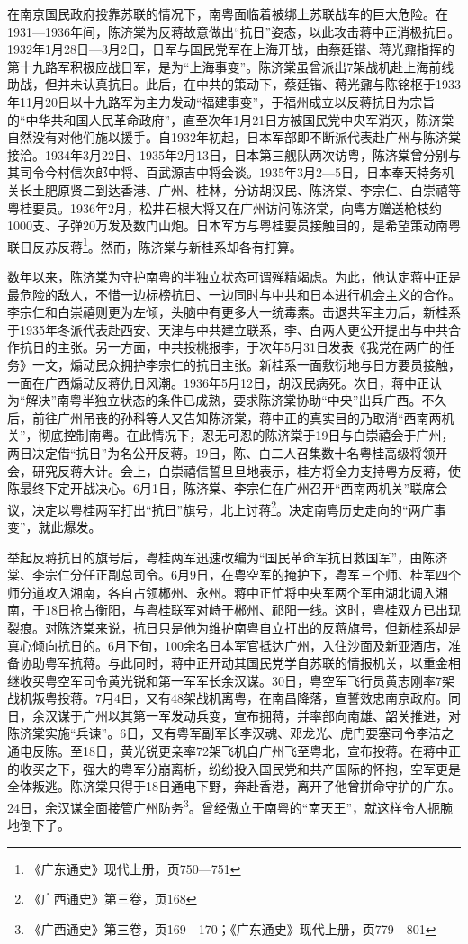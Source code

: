 在南京国民政府投靠苏联的情况下，南粤面临着被绑上苏联战车的巨大危险。在1931—1936年间，陈济棠为反蒋故意做出“抗日”姿态，以此攻击蒋中正消极抗日。1932年1月28日—3月2日，日军与国民党军在上海开战，由蔡廷锴、蒋光鼐指挥的第十九路军积极应战日军，是为“上海事变”。陈济棠虽曾派出7架战机赴上海前线助战，但并未认真抗日。此后，在中共的策动下，蔡廷锴、蒋光鼐与陈铭枢于1933年11月20日以十九路军为主力发动“福建事变”，于福州成立以反蒋抗日为宗旨的“中华共和国人民革命政府”，直至次年1月21日方被国民党中央军消灭，陈济棠自然没有对他们施以援手。自1932年初起，日本军部即不断派代表赴广州与陈济棠接洽。1934年3月22日、1935年2月13日，日本第三舰队两次访粤，陈济棠曾分别与其司令今村信次郎中将、百武源吉中将会谈。1935年3月2—5日，日本奉天特务机关长土肥原贤二到达香港、广州、桂林，分访胡汉民、陈济棠、李宗仁、白崇禧等粤桂要员。1936年2月，松井石根大将又在广州访问陈济棠，向粤方赠送枪枝约1000支、子弹20万发及数门山炮。日本军方与粤桂要员接触目的，是希望策动南粤联日反苏反蒋\footnote{《广东通史》现代上册，页750—751}。然而，陈济棠与新桂系却各有打算。

数年以来，陈济棠为守护南粤的半独立状态可谓殚精竭虑。为此，他认定蒋中正是最危险的敌人，不惜一边标榜抗日、一边同时与中共和日本进行机会主义的合作。李宗仁和白崇禧则更为左倾，头脑中有更多大一统毒素。击退共军主力后，新桂系于1935年冬派代表赴西安、天津与中共建立联系，李、白两人更公开提出与中共合作抗日的主张。另一方面，中共投桃报李，于次年5月31日发表《我党在两广的任务》一文，煽动民众拥护李宗仁的抗日主张。新桂系一面敷衍地与日方要员接触，一面在广西煽动反蒋仇日风潮。1936年5月12日，胡汉民病死。次日，蒋中正认为“解决”南粤半独立状态的条件已成熟，要求陈济棠协助“中央”出兵广西。不久后，前往广州吊丧的孙科等人又告知陈济棠，蒋中正的真实目的乃取消“西南两机关”，彻底控制南粤。在此情况下，忍无可忍的陈济棠于19日与白崇禧会于广州，两日决定借“抗日”为名公开反蒋。19日，陈、白二人召集数十名粤桂高级将领开会，研究反蒋大计。会上，白崇禧信誓旦旦地表示，桂方将全力支持粤方反蒋，使陈最终下定开战决心。6月1日，陈济棠、李宗仁在广州召开“西南两机关”联席会议，决定以粤桂两军打出“抗日”旗号，北上讨蒋\footnote{《广西通史》第三卷，页168}。决定南粤历史走向的“两广事变”，就此爆发。

举起反蒋抗日的旗号后，粤桂两军迅速改编为“国民革命军抗日救国军”，由陈济棠、李宗仁分任正副总司令。6月9日，在粤空军的掩护下，粤军三个师、桂军四个师分道攻入湘南，各自占领郴州、永州。蒋中正忙将中央军两个军由湖北调入湘南，于18日抢占衡阳，与粤桂联军对峙于郴州、祁阳一线。这时，粤桂双方已出现裂痕。对陈济棠来说，抗日只是他为维护南粤自立打出的反蒋旗号，但新桂系却是真心倾向抗日的。6月下旬，100余名日本军官抵达广州，入住沙面及新亚酒店，准备协助粤军抗蒋。与此同时，蒋中正开动其国民党学自苏联的情报机关，以重金相继收买粤空军司令黄光锐和第一军军长余汉谋。30日，粤空军飞行员黄志刚率7架战机叛粤投蒋。7月4日，又有48架战机离粤，在南昌降落，宣誓效忠南京政府。同日，余汉谋于广州以其第一军发动兵变，宣布拥蒋，并率部向南雄、韶关推进，对陈济棠实施“兵谏”。6日，又有粤军副军长李汉魂、邓龙光、虎门要塞司令李洁之通电反陈。至18日，黄光锐更亲率72架飞机自广州飞至粤北，宣布投蒋。在蒋中正的收买之下，强大的粤军分崩离析，纷纷投入国民党和共产国际的怀抱，空军更是全体叛逃。陈济棠只得于18日通电下野，奔赴香港，离开了他曾拼命守护的广东。24日，余汉谋全面接管广州防务\footnote{《广西通史》第三卷，页169—170；《广东通史》现代上册，页779—801}。曾经傲立于南粤的“南天王”，就这样令人扼腕地倒下了。

